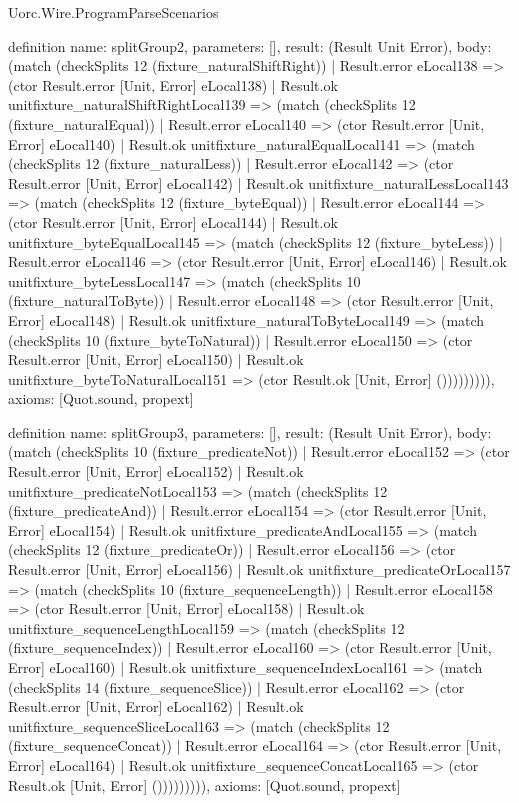 \begin{lexlean}{Uorc.Wire.ProgramParseScenarios}
\begin{semanticmodule}
definition{
  name: splitGroup2,
  parameters: [],
  result: (Result Unit Error),
  body: (match (checkSplits 12 (fixture_naturalShiftRight))
    | Result.error eLocal138 => (ctor Result.error [Unit, Error] eLocal138)
    | Result.ok unitfixture_naturalShiftRightLocal139 => (match (checkSplits 12 (fixture_naturalEqual))
      | Result.error eLocal140 => (ctor Result.error [Unit, Error] eLocal140)
      | Result.ok unitfixture_naturalEqualLocal141 => (match (checkSplits 12 (fixture_naturalLess))
        | Result.error eLocal142 => (ctor Result.error [Unit, Error] eLocal142)
        | Result.ok unitfixture_naturalLessLocal143 => (match (checkSplits 12 (fixture_byteEqual))
          | Result.error eLocal144 => (ctor Result.error [Unit, Error] eLocal144)
          | Result.ok unitfixture_byteEqualLocal145 => (match (checkSplits 12 (fixture_byteLess))
            | Result.error eLocal146 => (ctor Result.error [Unit, Error] eLocal146)
            | Result.ok unitfixture_byteLessLocal147 => (match (checkSplits 10 (fixture_naturalToByte))
              | Result.error eLocal148 => (ctor Result.error [Unit, Error] eLocal148)
              | Result.ok unitfixture_naturalToByteLocal149 => (match (checkSplits 10 (fixture_byteToNatural))
                | Result.error eLocal150 => (ctor Result.error [Unit, Error] eLocal150)
                | Result.ok unitfixture_byteToNaturalLocal151 => (ctor Result.ok [Unit, Error] ())))))))),
  axioms: [Quot.sound, propext]
}

definition{
  name: splitGroup3,
  parameters: [],
  result: (Result Unit Error),
  body: (match (checkSplits 10 (fixture_predicateNot))
    | Result.error eLocal152 => (ctor Result.error [Unit, Error] eLocal152)
    | Result.ok unitfixture_predicateNotLocal153 => (match (checkSplits 12 (fixture_predicateAnd))
      | Result.error eLocal154 => (ctor Result.error [Unit, Error] eLocal154)
      | Result.ok unitfixture_predicateAndLocal155 => (match (checkSplits 12 (fixture_predicateOr))
        | Result.error eLocal156 => (ctor Result.error [Unit, Error] eLocal156)
        | Result.ok unitfixture_predicateOrLocal157 => (match (checkSplits 10 (fixture_sequenceLength))
          | Result.error eLocal158 => (ctor Result.error [Unit, Error] eLocal158)
          | Result.ok unitfixture_sequenceLengthLocal159 => (match (checkSplits 12 (fixture_sequenceIndex))
            | Result.error eLocal160 => (ctor Result.error [Unit, Error] eLocal160)
            | Result.ok unitfixture_sequenceIndexLocal161 => (match (checkSplits 14 (fixture_sequenceSlice))
              | Result.error eLocal162 => (ctor Result.error [Unit, Error] eLocal162)
              | Result.ok unitfixture_sequenceSliceLocal163 => (match (checkSplits 12 (fixture_sequenceConcat))
                | Result.error eLocal164 => (ctor Result.error [Unit, Error] eLocal164)
                | Result.ok unitfixture_sequenceConcatLocal165 => (ctor Result.ok [Unit, Error] ())))))))),
  axioms: [Quot.sound, propext]
}


\end{semanticmodule}
\end{lexlean}
